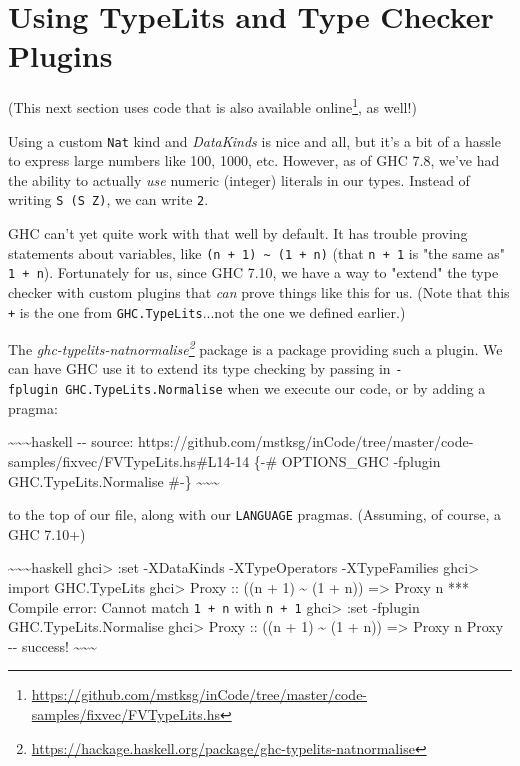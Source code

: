 \documentclass[]{article}
\renewcommand{\href}[2]{#2\footnote{\url{#1}}}
\begin{document}
\section{Using TypeLits and Type Checker Plugins}

(This next section uses code that is
\href{https://github.com/mstksg/inCode/tree/master/code-samples/fixvec/FVTypeLits.hs}{also
available online}, as well!)

Using a custom \texttt{Nat} kind and \emph{DataKinds} is nice and all, but it's
a bit of a hassle to express large numbers like 100, 1000, etc. However, as of
GHC 7.8, we've had the ability to actually \emph{use} numeric (integer) literals
in our types. Instead of writing \texttt{S\ (S\ Z)}, we can write \texttt{2}.

GHC can't yet quite work with that well by default. It has trouble proving
statements about variables, like
\texttt{(n\ +\ 1)\ \textasciitilde{}\ (1\ +\ n)} (that \texttt{n\ +\ 1} is "the
same as" \texttt{1\ +\ n}). Fortunately for us, since GHC 7.10, we have a way to
"extend" the type checker with custom plugins that \emph{can} prove things like
this for us. (Note that this \texttt{+} is the one from
\texttt{GHC.TypeLits}...not the one we defined earlier.)

The
\emph{\href{https://hackage.haskell.org/package/ghc-typelits-natnormalise}{ghc-typelits-natnormalise}}
package is a package providing such a plugin. We can have GHC use it to extend
its type checking by passing in \texttt{-fplugin\ GHC.TypeLits.Normalise} when
we execute our code, or by adding a pragma:

\textasciitilde{}\textasciitilde{}\textasciitilde{}haskell -\/- source:
https://github.com/mstksg/inCode/tree/master/code-samples/fixvec/FVTypeLits.hs\#L14-14
\{-\# OPTIONS\_GHC -fplugin GHC.TypeLits.Normalise \#-\}
\textasciitilde{}\textasciitilde{}\textasciitilde{}

to the top of our file, along with our \texttt{LANGUAGE} pragmas. (Assuming, of
course, a GHC 7.10+)

\textasciitilde{}\textasciitilde{}\textasciitilde{}haskell ghci\textgreater{}
:set -XDataKinds -XTypeOperators -XTypeFamilies ghci\textgreater{} import
GHC.TypeLits ghci\textgreater{} Proxy :: ((n + 1) \textasciitilde{} (1 + n))
=\textgreater{} Proxy n *** Compile error: Cannot match \texttt{1\ +\ n} with
\texttt{n\ +\ 1} ghci\textgreater{} :set -fplugin GHC.TypeLits.Normalise
ghci\textgreater{} Proxy :: ((n + 1) \textasciitilde{} (1 + n)) =\textgreater{}
Proxy n Proxy -\/- success! \textasciitilde{}\textasciitilde{}\textasciitilde{}
\end{document}
